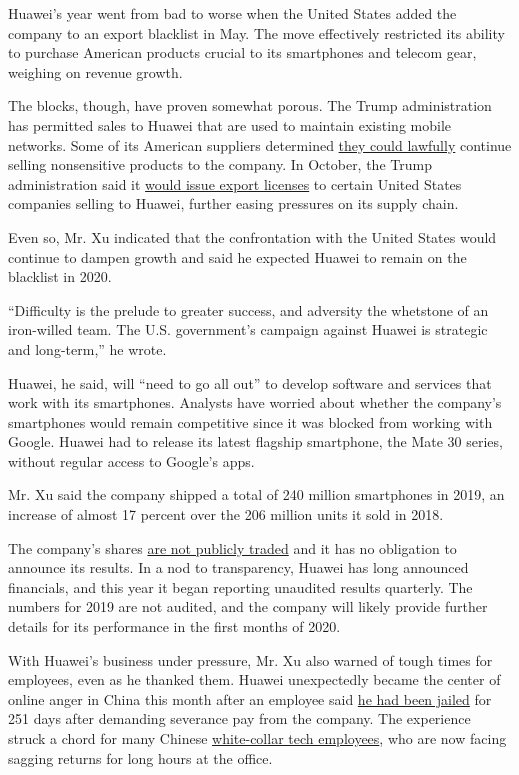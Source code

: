 Huawei's year went from bad to worse when the United States added the
company to an export blacklist in May. The move effectively restricted
its ability to purchase American products crucial to its smartphones and
telecom gear, weighing on revenue growth.

The blocks, though, have proven somewhat porous. The Trump
administration has permitted sales to Huawei that are used to maintain
existing mobile networks. Some of its American suppliers determined
\href{https://www.nytimes.com/2019/06/25/technology/huawei-trump-ban-technology.html}{they
could lawfully} continue selling nonsensitive products to the company.
In October, the Trump administration said it
\href{https://www.nytimes.com/2019/10/09/us/politics/trump-huawei-trade.html}{would
issue export licenses} to certain United States companies selling to
Huawei, further easing pressures on its supply chain.

Even so, Mr. Xu indicated that the confrontation with the United States
would continue to dampen growth and said he expected Huawei to remain on
the blacklist in 2020.

``Difficulty is the prelude to greater success, and adversity the
whetstone of an iron-willed team. The U.S. government's campaign against
Huawei is strategic and long-term,'' he wrote.

Huawei, he said, will ``need to go all out'' to develop software and
services that work with its smartphones. Analysts have worried about
whether the company's smartphones would remain competitive since it was
blocked from working with Google. Huawei had to release its latest
flagship smartphone, the Mate 30 series, without regular access to
Google's apps.

Mr. Xu said the company shipped a total of 240 million smartphones in
2019, an increase of almost 17 percent over the 206 million units it
sold in 2018.

The company's shares
\href{https://www.nytimes.com/2019/04/25/technology/who-owns-huawei.html}{are
not publicly traded} and it has no obligation to announce its results.
In a nod to transparency, Huawei has long announced financials, and this
year it began reporting unaudited results quarterly. The numbers for
2019 are not audited, and the company will likely provide further
details for its performance in the first months of 2020.

With Huawei's business under pressure, Mr. Xu also warned of tough times
for employees, even as he thanked them. Huawei unexpectedly became the
center of online anger in China this month after an employee said
\href{https://www.nytimes.com/2019/12/04/technology/huawei-china-backlash.html}{he
had been jailed} for 251 days after demanding severance pay from the
company. The experience struck a chord for many Chinese
\href{https://www.nytimes.com/2019/04/29/technology/china-996-jack-ma.html}{white-collar
tech employees}, who are now facing sagging returns for long hours at
the office.

